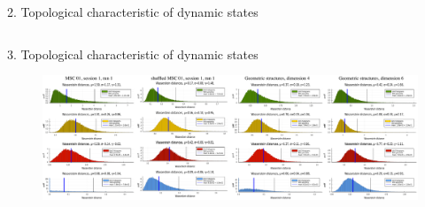 \documentclass[final]{beamer}
\begin{document}
\begin{frame}{}
\begin{block}{2. Topological characteristic of dynamic states}
\begin{columns}
{            %
            
            } %
        \end{columns}
      \end{block}
    
    \begin{block}{3. Topological characteristic of dynamic states}
    \begin{figure}[H]
            \centering
              \includegraphics[width=\linewidth]{images/distributions.pdf}
            \label{fig:preproc}
            \end{figure}
    \end{block}
    

\end{frame}
\end{document}
